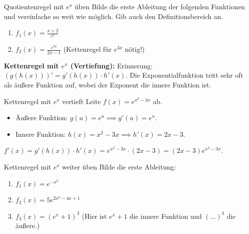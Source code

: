 \begin{aufgabenumgebung}{Quotientenregel mit $e^x$ üben}
Bilde die erste Ableitung der folgenden Funktionen und vereinfache so weit wie möglich. Gib auch den Definitionsbereich an.
\begin{enumerate}
    \item $f_1(x) = \frac{x+2}{e^x}$
    \item $f_2(x) = \frac{e^{3x}}{2x-1}$ (Kettenregel für $e^{3x}$ nötig!)
\end{enumerate}
\end{aufgabenumgebung}

\textbf{Kettenregel mit $e^x$ (Vertiefung):}
Erinnerung: $(g(h(x)))' = g'(h(x)) \cdot h'(x)$.
Die Exponentialfunktion tritt sehr oft als äußere Funktion auf, wobei der Exponent die innere Funktion ist.

\begin{beispielumgebung}{Kettenregel mit $e^x$ vertieft}
Leite $f(x) = e^{x^2-3x}$ ab.
\begin{itemize}
    \item Äußere Funktion: $g(u) = e^u \implies g'(u) = e^u$.
    \item Innere Funktion: $h(x) = x^2-3x \implies h'(x) = 2x-3$.
\end{itemize}
$f'(x) = g'(h(x)) \cdot h'(x) = e^{x^2-3x} \cdot (2x-3) = (2x-3)e^{x^2-3x}$.
\end{beispielumgebung}

\begin{aufgabenumgebung}{Kettenregel mit $e^x$ weiter üben}
Bilde die erste Ableitung:
\begin{enumerate}
    \item $f_1(x) = e^{-x^2}$
    \item $f_2(x) = 5e^{2x^3-4x+1}$
    \item $f_3(x) = (e^x+1)^3$ (Hier ist $e^x+1$ die innere Funktion und $(\dots)^3$ die äußere.)
\end{enumerate}
\end{aufgabenumgebung}



